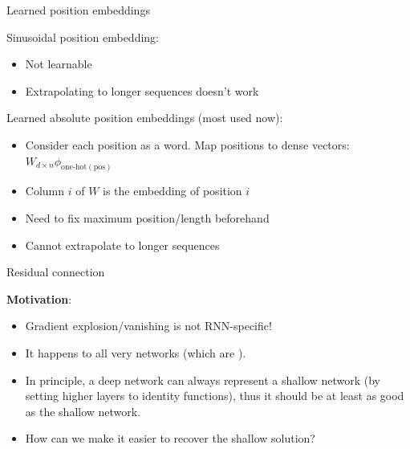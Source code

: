 \documentclass[usenames,dvipsnames,notes,11pt,aspectratio=169,hyperref={colorlinks=true, linkcolor=blue}]{beamer}
\begin{document}
\begin{frame}
    {Learned position embeddings}

    Sinusoidal position embedding:\\
    \begin{itemize}
        \item Not learnable
        \item Extrapolating to longer sequences doesn't work 
    \end{itemize}
    \pause

    Learned absolute position embeddings (most used now):\\
    \begin{itemize}
        \item Consider each position as a word. Map positions to dense vectors: $W_{d\times n}\phi_{\text{one-hot}(\text{pos})}$
        \item Column $i$ of $W$ is the embedding of position $i$
            \pause
        \item Need to fix maximum position/length beforehand
        \item Cannot extrapolate to longer sequences
    \end{itemize}
\end{frame}

\begin{frame}
    {Residual connection}

    \textbf{Motivation}:\\
    \begin{itemize}
        \item Gradient explosion/vanishing is not RNN-specific!
        \item It happens to all very  networks (which are ).
            \pause
        \item In principle, a deep network can always represent a shallow network (by setting higher layers to identity functions), thus it should be at least as good as the shallow network.
        \item How can we make it easier to recover the shallow solution?
    \end{itemize}
\end{frame}
\end{document}
